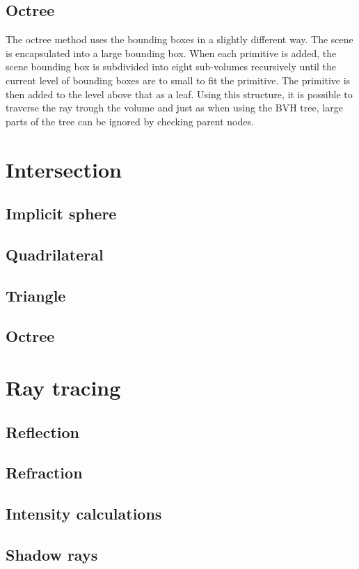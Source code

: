 \documentclass[]{report}   %
\begin{document}
\subsection{Octree}
The octree method uses the bounding boxes in a slightly different way.
The scene is encapsulated into a large bounding box.
When each primitive is added, the scene bounding box is subdivided into eight sub-volumes recursively until the current level of bounding boxes are to small to fit the primitive.
The primitive is then added to the level above that as a leaf.
Using this structure, it is possible to traverse the ray trough the volume and just as when using the BVH tree, large parts of the tree can be ignored by checking parent nodes.

\section{Intersection}
\subsection{Implicit sphere}
\subsection{Quadrilateral}
\subsection{Triangle}
\subsection{Octree}

\section{Ray tracing}
\subsection{Reflection}
\subsection{Refraction}
\subsection{Intensity calculations}
\subsection{Shadow rays}
\end{document}
